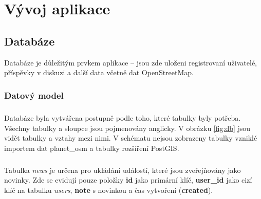 \documentclass[11pt,a4paper,titlepage,oneside]{book}
\begin{document}
\chapter{Vývoj aplikace}
		\section{Databáze}
Databáze je důležitým prvkem aplikace  -- jsou zde uloženi registrovaní uživatelé, příspěvky v diskuzi a další data včetně dat OpenStreetMap.
			\subsection{Datový model}
				\paragraph{}  Databáze byla vytvářena postupně podle toho, které tabulky byly potřeba. Všechny tabulky a sloupce jsou pojmenovány anglicky. V obrázku \ref{fig:db} jsou vidět tabulky a vztahy mezi nimi. V schématu nejsou zobrazeny tabulky vzniklé importem dat planet\_osm a tabulky rozšíření PostGIS. 
				\paragraph{}Tabulka \textit{news} je určena pro ukládání událostí, které jsou zveřejňovány jako novinky. Zde se evidují pouze položky \textbf{id} jako primární klíč, \textbf{user\_id} jako cizí klíč na tabulku \textit{users}, \textbf{note} s novinkou a čas vytvoření (\textbf{created}).


\end{document}
